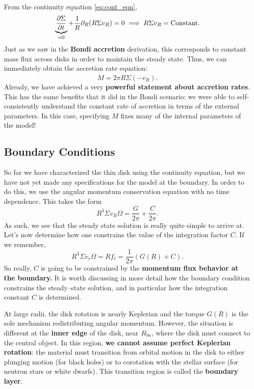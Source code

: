 From the continuity equation \eqref{eq:cont_eqn},
\[
\underbrace{\frac{\partial \Sigma}{\partial t} }_{=0} + \frac{1}{R} \partial_R(R \Sigma v_R) = 0 \implies R\Sigma v_R = {\rm Constant}.
\]
Just as we saw in the \textbf{Bondi accretion} derivation, this corresponds to constant mass flux across disks in order to maintain the steady state. Thus, we can immediately obtain the accretion rate equation:
\begin{equation}
    \label{eq:disc_acc_rate}
    \boxed{
    \dot{M} = 2\pi R \Sigma (-v_R).
    }
\end{equation}
Already, we have achieved a very \textbf{powerful statement about accretion rates}. This has the same benefits that it did in the Bondi scenario: we were able to self-consistently understand the constant rate of accretion in terms of the external parameters. In this case, specifying $\dot{M}$ fixes many of the internal parameters of the model!

\subsection{Boundary Conditions}

So far we have characterized the thin disk using the continuity equation, but we have not yet made any specifications for the model at the boundary. In order to do this, we use the angular momentum conservation equation with no time dependence. This takes the form
\begin{equation}
\label{eq:disk_steady_integral}
    R^3 \Sigma v_R \Omega = \frac{G}{2\pi} + \frac{C}{2\pi}.
\end{equation}
As such, we see that the steady state solution is really quite simple to arrive at. Let's now determine how one constrains the value of the integration factor $C$. If we remember, 
\[
R^3 \Sigma v_r \Omega = R f_\ell = \frac{1}{2\pi}(G(R)+C).
\]
So really, $C$ is going to be constrained by the \textbf{momentum flux behavior at the boundary.} It is worth discussing in more detail how the boundary condition constrains the steady--state solution, and in particular how the integration constant $C$ is determined.
\par
At large radii, the disk rotation is nearly Keplerian and the torque $G(R)$ is the sole mechanism redistributing angular momentum. However, the situation is different at the \textbf{inner edge} of the disk, near $R_{\rm in}$, where the disk must connect to the central object. In this region, \textbf{we cannot assume perfect Keplerian rotation}: the material must transition from orbital motion in the disk to either plunging motion (for black holes) or to corotation with the stellar surface (for neutron stars or white dwarfs). This transition region is called the \textbf{boundary layer}. 

